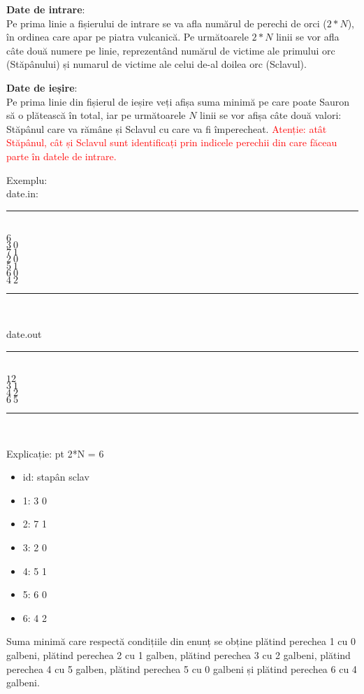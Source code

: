 \documentclass[a4paper,5pt]{article}
\begin{document}
\textbf{Date de intrare}: \\
Pe prima linie a fișierului de intrare se va afla numărul de perechi de orci 
($2*N$), în ordinea care apar pe piatra vulcanică.
Pe următoarele $2*N$ linii se vor afla câte două numere
pe linie, reprezentând numărul de victime ale primului orc (Stăpânului) și
numarul de victime ale celui de-al doilea orc (Sclavul).

\textbf{Date de ieșire}: \\
Pe prima linie din fișierul de ieșire veți afișa suma minimă pe care poate Sauron să o 
plătească în total, iar pe următoarele $N$ linii se vor afișa câte două valori:
Stăpânul care va rămâne și Sclavul cu care va fi împerecheat.
\textcolor{red}{Atenție: atât Stăpânul, cât și Sclavul sunt identificați prin indicele perechii din care
făceau parte în datele de intrare.}

Exemplu: \\
date.in: \\
\rule{50mm}{0.1mm}\\
\noindent
$6$ \\
$3\ 0$ \\
$7\ 1$ \\
$2\ 0$ \\
$5\ 1$ \\ 
$6\ 0$ \\
$4\ 2$ \\
\rule{50mm}{0.1mm}\\
\indent

date.out \\
\rule{50mm}{0.1mm}\\
\noindent
$12$ \\
$3\ 1$ \\
$4\ 2$ \\
$6\ 5$ \\
\rule{50mm}{0.1mm}\\
\indent

Explicație:
pt 2*N = 6
\begin{itemize}
	\item id: stapân sclav
	\item 1: 3 0
	\item 2: 7 1
	\item 3: 2 0
	\item 4: 5 1
	\item 5: 6 0
	\item 6: 4 2
\end{itemize}

Suma minimă care respectă condițiile din enunț se obține plătind perechea 1 cu 
0 galbeni, plătind perechea 2 cu 1 galben, plătind perechea 3 cu 2 galbeni, 
plătind perechea 4 cu 5 galben, plătind perechea 5 cu 0 galbeni și plătind 
perechea 6 cu 4 galbeni.
\end{document}
